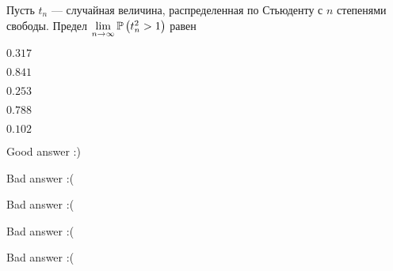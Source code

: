 
\begin{question}
Пусть \(t_n\) --- случайная величина, распределенная по Стьюденту с
\(n\) степенями свободы. Предел
\(\lim\limits_{n\to\infty}\P\left(t_{n}^2>1\right)\) равен
\begin{answerlist}
  \item \(0.317\)
  \item \(0.841\)
  \item \(0.253\)
  \item \(0.788\)
  \item \(0.102\)
\end{answerlist}
\end{question}

\begin{solution}
\begin{answerlist}
  \item Good answer :)
  \item Bad answer :(
  \item Bad answer :(
  \item Bad answer :(
  \item Bad answer :(
\end{answerlist}
\end{solution}


